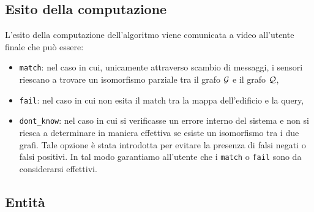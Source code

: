 \documentclass{llncs}
\begin{document}
\subsection{Esito della computazione}
L'esito della computazione dell'algoritmo viene comunicata a video all'utente finale che può essere:
\begin{itemize}
	\item \texttt{match}: nel caso in cui, unicamente attraverso scambio di messaggi, i sensori riescano a trovare
	 un isomorfismo parziale tra il grafo $\mathcal{G}$ e il grafo $\mathcal{Q}$,
	\item \texttt{fail}: nel caso in cui non esita il match tra la mappa dell'edificio e la query,
	\item \texttt{dont\_know}: nel caso in cui si verificasse un errore interno del sistema e 
	non si riesca a determinare in maniera effettiva se esiste un isomorfismo tra i due grafi. Tale opzione 
	è stata introdotta per evitare la presenza di falsi negati o falsi positivi. In tal modo garantiamo all'utente 
	che i  \texttt{match} o \texttt{fail} sono da considerarsi effettivi.
\end{itemize}

\subsection{Entità}
\end{document}
